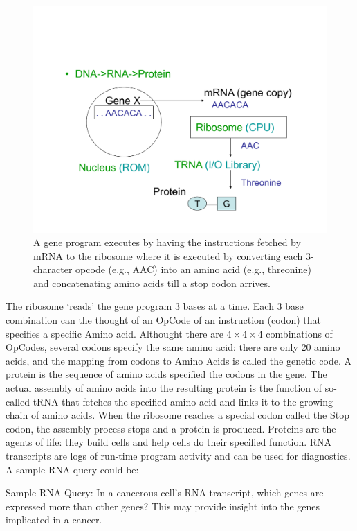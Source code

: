 \documentclass[10pt,fullpage]{article}
\begin{document}
\begin{figure}[h!]
  \centering
\includegraphics[trim=10mm 10mm 20mm 40mm, clip, width=4.5in]{fig/centraldogma.pdf}  
\caption{A gene program executes by having the instructions fetched by
  mRNA to the ribosome where it is executed by converting each
  3-character opcode (e.g., AAC) into an amino acid (e.g., threonine)
  and concatenating amino acids till a stop codon arrives.}
  \label{fig:centraldogma}
\end{figure}

The ribosome `reads' the gene program 3 bases at a time.  Each 3 base
combination can the thought of an OpCode of an instruction (codon)
that specifies a specific Amino acid. Althought there are $4\times 4\times 4$
combinations of OpCodes, several codons specify the same amino acid:
there are only 20 amino acids, and the mapping from codons to Amino
Acids is called the genetic code.  A protein is the sequence of amino
acids specified the codons in the gene.  The actual assembly of amino
acids into the resulting protein is the function of so-called tRNA
that fetches the specified amino acid and links it to the growing
chain of amino acids.  When the ribosome reaches a special codon
called the Stop codon, the assembly process stops and a protein is
produced.  Proteins are the agents of life: they build cells and help
cells do their specified function.  RNA transcripts are logs of
run-time program activity and can be used for diagnostics.  A sample
RNA query could be:

Sample RNA Query: In a cancerous cell's RNA transcript, which genes
are expressed more than other genes? This may provide insight into the
genes implicated in a cancer.
\end{document}
